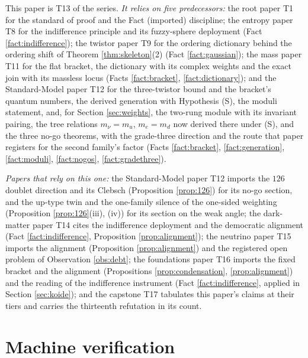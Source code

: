 \documentclass[11pt]{article}
\theoremstyle{definition}
\begin{document}
This paper is T13 of the series. \emph{It relies on five predecessors:} the root paper T1 \cite{ButlerT1} for the standard of proof and the Fact (imported) discipline; the entropy paper T8 \cite{ButlerT8} for the indifference principle and its fuzzy-sphere deployment (Fact \ref{fact:indifference}); the twistor paper T9 \cite{ButlerT9} for the ordering dictionary behind the ordering shift of Theorem \ref{thm:skeleton}(2) (Fact \ref{fact:gaussian}); the mass paper T11 \cite{ButlerT11} for the flat bracket, the dictionary with its complex weights and the exact join with its massless locus (Facts \ref{fact:bracket}, \ref{fact:dictionary}); and the Standard-Model paper T12 \cite{ButlerT12} for the three-twistor bound and the bracket's quantum numbers, the derived generation with Hypothesis (S), the moduli statement, and, for Section \ref{sec:weights}, the two-rung module with its invariant pairing, the tree relations $m_{\nu} = m_{u}$, $m_{e} = m_{d}$ now derived there under (S), and the three no-go theorems, with the grade-three direction and the route that paper registers for the second family's factor (Facts \ref{fact:bracket}, \ref{fact:generation}, \ref{fact:moduli}, \ref{fact:nogos}, \ref{fact:gradethree}).

\emph{Papers that rely on this one:} the Standard-Model paper T12 \cite{ButlerT12} imports the $126$ doublet direction and its Clebsch (Proposition \ref{prop:126}) for its no-go section, and the up-type twin and the one-family silence of the one-sided weighting (Proposition \ref{prop:126}(iii), (iv)) for its section on the weak angle; the dark-matter paper T14 \cite{ButlerT14} cites the indifference deployment and the democratic alignment (Fact \ref{fact:indifference}, Proposition \ref{prop:alignment}); the neutrino paper T15 \cite{ButlerT15} imports the alignment (Proposition \ref{prop:alignment}) and the registered open problem of Observation \ref{obs:debt}; the foundations paper T16 \cite{ButlerT16} imports the fixed bracket and the alignment (Propositions \ref{prop:condensation}, \ref{prop:alignment}) and the reading of the indifference instrument (Fact \ref{fact:indifference}, applied in Section \ref{sec:koide}); and the capstone T17 \cite{ButlerT17} tabulates this paper's claims at their tiers and carries the thirteenth refutation in its count.

\section{Machine verification}\label{sec:verification}
\end{document}

